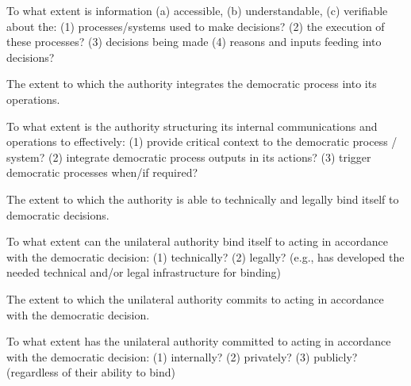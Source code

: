     \begin{evaluate}[black]
        To what extent is information (a) accessible, (b) understandable, (c) verifiable about the: (1) processes/systems used to make decisions? (2) the execution of these processes? (3) decisions being made (4) reasons and inputs feeding into decisions?
    \end{evaluate}
    \dscplaceholder
    
    
    \begin{describe}[black]
        The extent to which the authority integrates the democratic process into its operations.
    \end{describe}
    \dscplaceholder
    
    \begin{evaluate}[black]
        To what extent is the authority structuring its internal communications and operations to effectively: (1) provide critical context to the democratic process / system? (2) integrate democratic process outputs in its actions? (3) trigger democratic processes when/if required?
    \end{evaluate}
    \dscplaceholder
    
    
    \begin{describe}[black]
        The extent to which the authority is able to technically and legally bind itself to democratic decisions.
    \end{describe}
    \dscplaceholder
    
    \begin{evaluate}[black]
        To what extent can the unilateral authority bind itself to acting in accordance with the democratic decision: (1) technically? (2) legally? (e.g., has developed the needed technical and/or legal infrastructure for binding)
    \end{evaluate}
    \dscplaceholder
    
    
    \begin{describe}[black]
        The extent to which the unilateral authority commits to acting in accordance with the democratic decision.
    \end{describe}
    \dscplaceholder
    
    \begin{evaluate}[black]
        To what extent has the unilateral authority committed to acting in accordance with the democratic decision: (1) internally? (2) privately? (3) publicly?  (regardless of their ability to bind)
    \end{evaluate}
    \dscplaceholder
    
